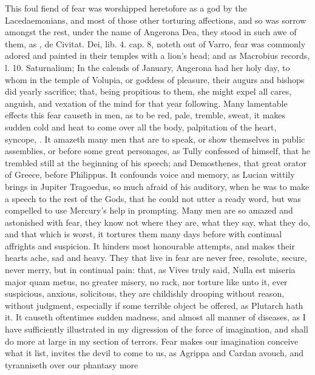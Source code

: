 {{This foul fiend of fear was worshipped heretofore as a god by the
Lacedaemonians, and most of those other torturing affections, and
so was sorrow amongst the rest, under the name of Angerona Dea, they
stood in such awe of them, as \Austin{}, de Civitat. Dei, lib. 4. cap. 8,
noteth out of Varro, fear was commonly adored and painted in
their temples with a lion's head; and as Macrobius records, l. 10.
Saturnalium; In the calends of January, Angerona had her holy
day, to whom in the temple of Volupia, or goddess of pleasure, their
augurs and bishops did yearly sacrifice; that, being propitious to
them, she might expel all cares, anguish, and vexation of the mind for
that year following. Many lamentable effects this fear causeth in men,
as to be red, pale, tremble, sweat, it makes sudden cold and heat
to come over all the body, palpitation of the heart, syncope, \etc{}. It
amazeth many men that are to speak, or show themselves in public
assemblies, or before some great personages, as Tully confessed of
himself, that he trembled still at the beginning of his speech; and
Demosthenes, that great orator of Greece, before Philippus. It
confounds voice and memory, as Lucian wittily brings in Jupiter
Tragoedus, so much afraid of his auditory, when he was to make a speech
to the rest of the Gods, that he could not utter a ready word, but was
compelled to use Mercury's help in prompting. Many men are so amazed
and astonished with fear, they know not where they are, what they say,
what they do, and that which is worst, it tortures them many days
before with continual affrights and suspicion. It hinders most
honourable attempts, and makes their hearts ache, sad and heavy. They
that live in fear are never free, resolute, secure, never merry,
but in continual pain: that, as Vives truly said, Nulla est miseria
major quam metus, no greater misery, no rack, nor torture like unto it,
ever suspicious, anxious, solicitous, they are childishly drooping
without reason, without judgment, especially if some terrible
object be offered, as Plutarch hath it. It causeth oftentimes sudden
madness, and almost all manner of diseases, as I have sufficiently
illustrated in my  digression of the force of imagination, and
shall do more at large in my section of terrors. Fear makes our
imagination conceive what it list, invites the devil to come to us, as
Agrippa and Cardan avouch, and tyranniseth over our phantasy more
}}
